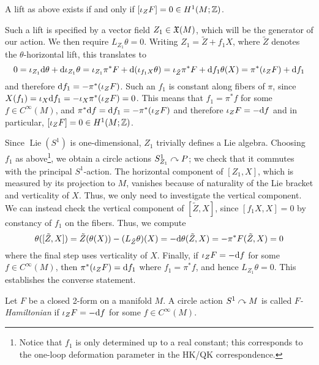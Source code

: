 \begin{prop}
	A lift as above exists if and only if $[\iota_Z F]=0\in H^1(M;\mathbb{Z})$.
\end{prop}
\begin{myproof}
	Such a lift is specified by a vector field $Z_1\in \mathfrak{X}(M)$, which will be the generator of our action. We then require $L_{Z_1}\theta=0$. Writing $Z_1=\tilde Z+f_1 X$, where $\tilde Z$ denotes the $\theta$-horizontal lift, this translates to
	\begin{equation*}
		0=\iota_{Z_1}\mathrm{d} \theta+\mathrm{d} \iota_{Z_1}\theta=\iota_{Z_1}\pi^*F+\mathrm{d}(\iota_{f_1 X}\theta)
		=\iota_{\tilde Z}\pi^*F+\mathrm{d} f_1 \theta(X)=\pi^*(\iota_Z F)+\mathrm{d} f_1
	\end{equation*}
	and therefore $\mathrm{d} f_1=-\pi^*(\iota_Z F)$. Such an $f_1$ is constant along fibers of $\pi$, since $X(f_1)=\iota_X\mathrm{d} f_1=-\iota_X\pi^*(\iota_ZF)=0$. This means that $f_1=\pi^*f$ for some $f\in C^\infty(M)$, and $\pi^*\mathrm{d} f=\mathrm{d} f_1=-\pi^*(\iota_Z F)$ and therefore $\iota_Z F=-\mathrm{d} f$ and in particular, $[\iota_ZF]=0\in H^1(M;\mathbb{Z})$.
	
	Since $\operatorname{Lie}(S^1)$ is one-dimensional, $Z_1$ trivially defines a Lie algebra. Choosing $f_1$ as above\footnote{Notice that $f_1$ is only determined up to a real constant; this corresponds to the one-loop deformation parameter in the HK/QK correspondence.}, we obtain a circle actions $S^1_{Z_1}\curvearrowright P$; we check that it commutes with the principal $S^1$-action. The horizontal component of $[Z_1,X]$, which is measured by its projection to $M$, vanishes because of naturality of the Lie bracket and verticality of $X$. Thus, we only need to investigate the vertical component. We can instead check the vertical component of $[\tilde Z,X]$, since $[f_1X,X]=0$ by constancy of $f_1$ on the fibers. Thus, we compute
	\begin{equation*}
		\theta([\tilde Z,X])=\tilde Z(\theta(X))-(L_{\tilde Z}\theta)(X)
		=-\mathrm{d} \theta(\tilde Z,X)=-\pi^*F(\tilde Z,X)=0
	\end{equation*} 
	where the final step uses verticality of $X$. Finally, if $\iota_Z F=-\mathrm{d} f$ for some $f\in C^\infty(M)$, then $\pi^*(\iota_Z F)=\mathrm{d} f_1$ where $f_1=\pi^*f$, and hence $L_{Z_1}\theta=0$. This establishes the converse statement.
\end{myproof}

\begin{mydef}
	Let $F$ be a closed 2-form on a manifold $M$. A circle action $S^1\curvearrowright M$ is called \emph{$F$-Hamiltonian} if $\iota_ZF=-\mathrm{d} f$ for some $f\in C^\infty(M)$.
\end{mydef}